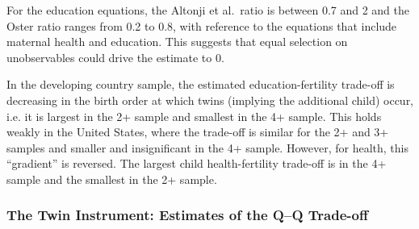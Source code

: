 \documentclass[subeqn]{article}
\begin{document}
\begin{spacing}{1.4}
For the education equations, the Altonji et al.\ ratio is between 0.7 and 2 and the Oster ratio ranges from 0.2 to 0.8, with reference to the equations that include maternal health and education.
This suggests that equal selection on unobservables could drive the estimate to 0.  

In the developing country sample, the estimated education-fertility trade-off is decreasing in the birth order at which twins (implying the additional child) occur, i.e. it is largest in the 2+ sample and smallest in the 4+ sample. This holds weakly in the United States, where the trade-off is similar for the 2+ and 3+ samples and smaller and insignificant in the 4+ sample. However, for health, this "`gradient"' is reversed. The largest child health-fertility trade-off is in the 4+ sample and the smallest in the 2+ sample.

\subsubsection{The Twin Instrument: Estimates of the Q--Q Trade-off} \label{TWINsscn:QQtwinsIV}


\end{spacing}
\end{document}
